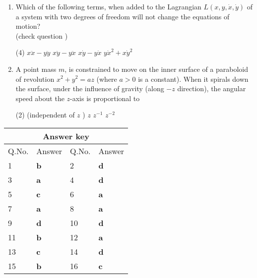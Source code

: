 \begin{enumerate}
	The particle of mass in on the plane undergoes a circular motion with radius $r_{0}$ and angular momentum $L$. When a small radial displacement $\in$ (whew $\in \ll<r_{0}$ ) is applied, its radial coordinate is found to oscillate about $r_{0}$. The frequency of the oscillations is
	{}
	\begin{tasks}(2)
		\task[\textbf{A.}] $\sqrt{\frac{7 m_{2} g}{\left(m_{1}+\frac{m_{2}}{2}\right) r_{0}}}$
		\task[\textbf{B.}] $\sqrt{\frac{7 m_{2} g}{\left(m_{1}+m_{2}\right) r_{0}}}$
		\task[\textbf{C.}] $\sqrt{\frac{3 m_{2} g}{\left(m_{1}+\frac{m_{2}}{2}\right) r_{0}}}$
		\task[\textbf{D.}] $\sqrt{\frac{3 m_{2} g}{\left(m_{1}+m_{2}\right) r_{0}}}$
	\end{tasks}	
	\item Which of the following terms, when added to the Lagrangian $L(x, y, \dot{x}, \dot{y})$ of a system with two degrees of freedom will not change the equations of motion?\\
	(check question )
	{}
	\begin{tasks}(4)
		\task[\textbf{A.}] $x \ddot{x}-y \ddot{y}$
		\task[\textbf{B.}] $x \ddot{y}-y \ddot{x}$
		\task[\textbf{C.}] $x \dot{y}-y \dot{x}$
		\task[\textbf{D.}] $y \dot{x}^{2}+x \dot{y}^{2}$ 
	\end{tasks}
	\item A point mass $m$, is constrained to move on the inner surface of a paraboloid of revolution $x^{2}+y^{2}=a z$ (where $a>0$ is a constant). When it spirals down the surface, under the influence of gravity (along $-z$ direction), the angular speed about the $z$-axis is proportional to
	{}
	\begin{tasks}(2)
		 (independent of $z$ )
		\task[\textbf{B.}] $z$
		\task[\textbf{C.}]  $z^{-1}$
		\task[\textbf{D.}] $z^{-2}$
	\end{tasks}	
\end{enumerate}
\setlength\arrayrulewidth{1pt}
\begin{table}[H]
	\centering
	\begin{tabular}{|p{1.5cm}|p{1.5cm}||p{1.5cm}|p{1.5cm}|}
		\hline
		\multicolumn{4}{|c|}{\textbf{Answer key}}\\\hline\hline
		\rowcolor{ocrel}Q.No.&Answer&Q.No.&Answer\\\hline
		1&\textbf{b} &2&\textbf{d}\\\hline 
		3&\textbf{a} &4&\textbf{d} \\\hline
		5&\textbf{c} &6&\textbf{a} \\\hline
		7&\textbf{a}&8&\textbf{a}\\\hline
		9&\textbf{d}&10&\textbf{d}\\\hline
		11&\textbf{b} &12&\textbf{a}\\\hline
		13&\textbf{c}&14&\textbf{d}\\\hline
		15&\textbf{b}&16&\textbf{c}\\\hline
		
	\end{tabular}
\end{table}
